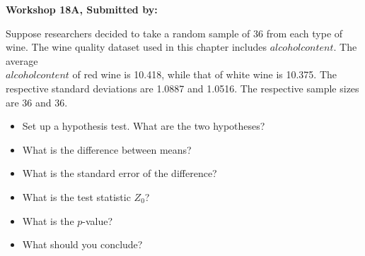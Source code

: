 \documentclass[11pt]{book}\usepackage[]{graphicx}\usepackage[]{color}
\begin{document}
\begin{exercises}
\begin{exercise}
\end{exercise}
\begin{solution}  %

\end{solution}

\clearpage

    \begin{exercise}  %



    \begin{center}
\begin{flushleft}\textbf{\large \hfill Workshop 18A, Submitted by: }\end{flushleft}

\end{center}

Suppose researchers decided to take a random sample of 36 from each type of wine.  The wine quality dataset used in this chapter includes $alcohol content$. The average \\ $alcohol content$ of red wine is 10.418, while that of white wine is 10.375. The respective standard deviations are 1.0887 and 1.0516. The respective sample sizes are 36 and 36.

\begin{itemize}
  \item Set up a hypothesis test. What are the two hypotheses?
  \item What is the difference between means?
  \item What is the standard error of the difference?
  \item What is the test statistic $Z_0$?
  \item What is the $p$-value?
  \item What should you conclude?
\end{itemize}


\end{exercise}
\end{exercises}
\end{document}
